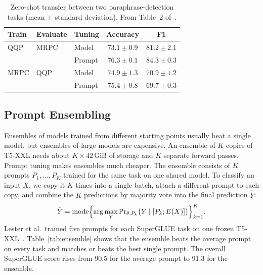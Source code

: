 \documentclass[12pt]{article}
\begin{document}
\begin{table}[htbp]
  \centering
  \caption{Zero-shot transfer between two paraphrase-detection tasks (mean $\pm$ standard
    deviation). From Table~2 of~\cite{lester2021}.}
  \label{tab:paraphrase}
  \small
  \begin{tabular}{@{}l l l c c@{}}
    \toprule
    \textbf{Train} & \textbf{Evaluate} & \textbf{Tuning} & \textbf{Accuracy} & \textbf{F1}\\
    \midrule
    QQP  & MRPC & Model  & $73.1\pm0.9$ & $81.2\pm2.1$\\
         &      & Prompt & $\mathbf{76.3}\pm0.1$ & $\mathbf{84.3}\pm0.3$\\
    \midrule
    MRPC & QQP  & Model  & $74.9\pm1.3$ & $\mathbf{70.9}\pm1.2$\\
         &      & Prompt & $\mathbf{75.4}\pm0.8$ & $69.7\pm0.3$\\
    \bottomrule
  \end{tabular}
\end{table}

\subsection{Prompt Ensembling}\label{sec:ensemble}

Ensembles of models trained from different starting points usually beat a single model, but
ensembles of large models are expensive. An ensemble of $K$ copies of T5-XXL needs about
$K\times42$\,GiB of storage and $K$ separate forward passes. Prompt tuning makes ensembles
much cheaper. The ensemble consists of $K$ prompts $P_1,\dots,P_K$ trained for the same task
on one shared model. To classify an input $X$, we copy it $K$ times into a single batch,
attach a different prompt to each copy, and combine the $K$ predictions by majority vote into
the final prediction $\hat{Y}$:
\begin{equation}
  \hat{Y}=\operatorname{mode}\Bigl\{\arg\max_{Y}\Pr\nolimits_{\theta;P_k}\bigl(Y\mid[P_k;E(X)]\bigr)\Bigr\}_{k=1}^{K}.
  \label{eq:ensemble}
\end{equation}
Lester et al.\ trained five prompts for each SuperGLUE task on one frozen
T5-XXL~\cite{lester2021}. Table~\ref{tab:ensemble} shows that the ensemble beats the average
prompt on every task and matches or beats the best single prompt. The overall SuperGLUE score
rises from 90.5 for the average prompt to 91.3 for the ensemble.
\end{document}
